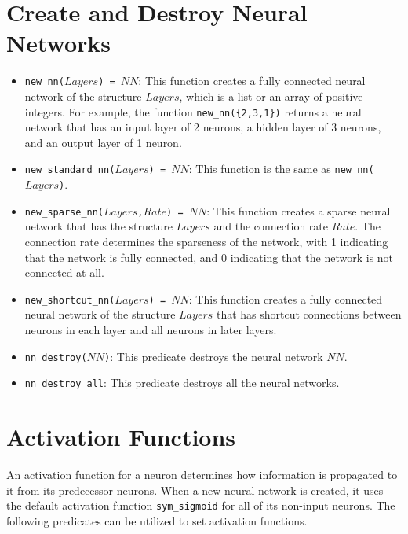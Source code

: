 \section{Create and Destroy Neural Networks}
\begin{itemize}
\item \texttt{new\_nn($Layers$) = $NN$}: This function creates a fully connected neural network of the structure $Layers$, which is a list or an array of positive integers. For example, the function \texttt{new\_nn(\{2,3,1\})} returns a neural network that has an input layer of 2 neurons, a hidden layer of 3 neurons, and an output layer of 1 neuron.

\item \texttt{new\_standard\_nn($Layers$) = $NN$}: This function is the same as \texttt{new\_nn($Layers$)}.

\item \texttt{new\_sparse\_nn($Layers$,$Rate$) = $NN$}: This function creates a sparse neural network that has the structure $Layers$ and the connection rate $Rate$. The connection rate determines the sparseness of the network, with 1 indicating that the network is fully connected, and 0 indicating that the network is not connected at all.

\item \texttt{new\_shortcut\_nn($Layers$) = $NN$}: This function creates a fully connected neural network of the structure $Layers$ that has shortcut connections between neurons in each layer and all neurons in later layers.

\item \texttt{nn\_destroy($NN$)}: This predicate destroys the neural network $NN$.

\item \texttt{nn\_destroy\_all}: This predicate destroys all the neural networks.
\end{itemize}

\section{Activation Functions}
An activation function for a neuron determines how information is propagated to it from its predecessor neurons. When a new neural network is created, it uses the default activation function \texttt{sym\_sigmoid} for all of its non-input neurons. The following predicates can be utilized to set activation functions.

